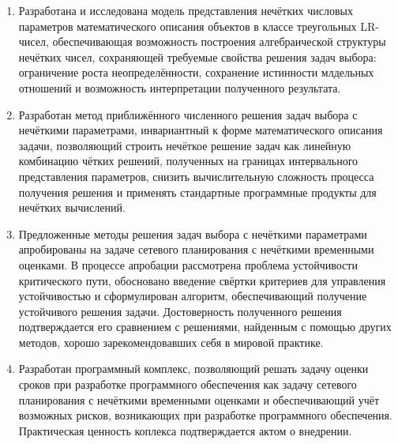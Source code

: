 \begin{enumerate}
  \item Разработана и исследована модель представления нечётких числовых параметров математического описания объектов в классе треугольных LR-чисел, обеспечивающая возможность построения алгебраической структуры нечётких чисел, сохраняющей требуемые свойства решения задач выбора: ограничение роста неопределённости, сохранение истинности млдельных отношений и возможность интерпретации полученного результата.
  \item Разработан метод приближённого численного решения задач выбора с нечёткими параметрами, инвариантный к форме математического описания задачи, позволяющий строить нечёткое решение задач как линейную комбинацию чётких решений, полученных на границах интервального представления параметров, снизить вычислительную сложность процесса получения решения и применять стандартные программные продукты для нечётких вычислений.
  \item Предложенные методы решения задач выбора с нечёткими параметрами апробированы на задаче сетевого планирования с нечёткими временными оценками. В процессе апробации рассмотрена проблема устойчивости критического пути, обосновано введение свёртки критериев для управления устойчивостью и сформулирован алгоритм, обеспечивающий получение устойчивого решения задачи. Достоверность полученного решения подтверждается его сравнением с решениями, найденным с помощью других методов, хорошо зарекомендовавших себя в мировой практике.
  \item Разработан программный комплекс, позволяющий решать задачу оценки сроков при разработке программного обеспечения как задачу сетевого планирования с нечёткими временными оценками и обеспечивающий учёт возможных рисков, возникающих при разработке программного обеспечения. Практическая ценность коплекса подтверждается актом о внедрении.   
\end{enumerate}
